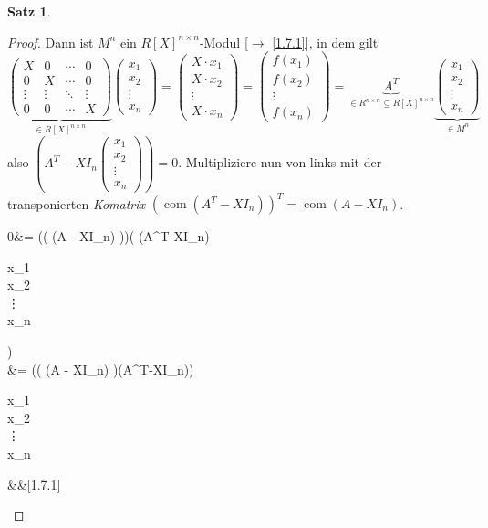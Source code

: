 \documentclass[
twoside=semi,
fontsize=12,
DIV=12, 
cleardoublepage=current,
leqno,
headings=optiontoheadandtoc, 
toc=idx
]{scrbook}
\newcommand{\brac}[1]{\left( #1 \right)}
\DeclareMathOperator{\com}{com}
\theoremstyle{definition}
\newtheorem{satz}[definition]{Satz}
\begin{document}
\begin{satz}
\begin{proof}
			Dann ist $M^n$ ein $R[X]^{n\times n}$-Modul [$\to$ \ref{1.7.1}], in dem gilt 
			\[\underbrace{\begin{pmatrix}
					X & 0 & \cdots & 0\\
					0 & X & \cdots & 0\\
					\vdots & \vdots & \ddots & \vdots\\
					0 & 0 & \cdots & X
			\end{pmatrix}}_{\in R[X]^{n\times n}} \begin{pmatrix}
		x_1\\x_2\\\vdots\\x_n
		\end{pmatrix} = \begin{pmatrix}
		X \cdot x_1\\X \cdot x_2\\\vdots\\X \cdot x_n
		\end{pmatrix} = \begin{pmatrix}
		f(x_1)\\f(x_2)\\\vdots\\f(x_n)
		\end{pmatrix} = \underbrace{A^T}_{\in R^{n\times n} \subseteq R[X]^{n\times n}}\underbrace{\begin{pmatrix}
			x_1\\x_2\\\vdots\\x_n
		\end{pmatrix}}_{\in M^n}\] 
		also  $(A^T-XI_n\begin{pmatrix}x_1\\x_2\\\vdots\\x_n\end{pmatrix}) = 0$. Multipliziere nun von links mit der transponierten \emph{Komatrix} $\brac{\com(A^T - XI_n)}^T = \com(A-XI_n)$.
		\begin{flalign*}
			0&= (\brac{\com(A - XI_n)})\brac{(A^T-XI_n)\begin{pmatrix}x_1\\x_2\\\vdots\\x_n\end{pmatrix}}\\
			&=  (\brac{\com(A - XI_n)}(A^T-XI_n))\begin{pmatrix}x_1\\x_2\\\vdots\\x_n\end{pmatrix}   &&\ref{1.7.1}\\

\end{flalign*}
\end{proof}
\end{satz}
\end{document}
